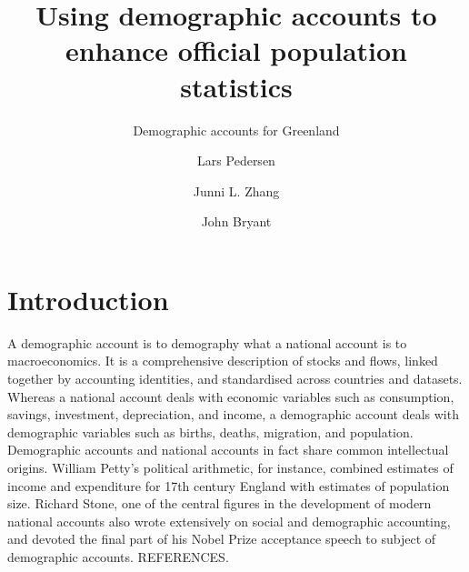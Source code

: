 \documentclass[USenglish]{article}
\begin{document}

  \author*[1]{Lars Pedersen}
  \author[2]{Junni L. Zhang}
  \author[3]{John Bryant} 
  \title{Using demographic accounts to enhance official population statistics}
  \subtitle{Demographic accounts for Greenland}
  \aop

\maketitle



\section{Introduction} 

A demographic account is to demography what a national account is to macroeconomics. It is a comprehensive description of stocks and flows, linked together by accounting identities, and standardised across countries and datasets. Whereas a national account deals with economic variables such as consumption, savings, investment, depreciation, and income, a demographic account deals with demographic variables such as births, deaths, migration, and population. Demographic accounts and national accounts in fact share common intellectual origins. William Petty's political arithmetic, for instance, combined estimates of income and expenditure for 17th century England with estimates of population size. Richard Stone, one of the central figures in the development of modern national accounts also wrote extensively on social and demographic accounting, and devoted the final part of his Nobel Prize acceptance speech to subject of demographic accounts. REFERENCES.
\end{document}

